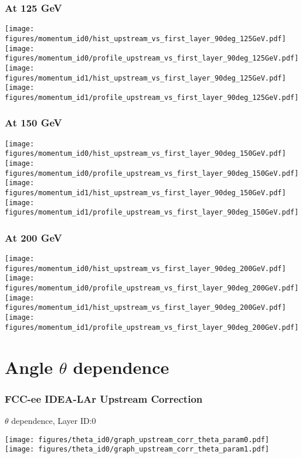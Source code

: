 \documentclass{beamer}
\newcommand{\redtext}[1]{%
  \textcolor{myRed}{#1}
}
\begin{document}
\begin{frame}
  \frametitle{At 125 GeV}

  \centering
  \texttt{[image: figures/momentum\_id0/hist\_upstream\_vs\_first\_layer\_90deg\_125GeV.pdf]}
  \texttt{[image: figures/momentum\_id0/profile\_upstream\_vs\_first\_layer\_90deg\_125GeV.pdf]} \\
  \texttt{[image: figures/momentum\_id1/hist\_upstream\_vs\_first\_layer\_90deg\_125GeV.pdf]}
  \texttt{[image: figures/momentum\_id1/profile\_upstream\_vs\_first\_layer\_90deg\_125GeV.pdf]}
\end{frame}

\begin{frame}
  \frametitle{At 150 GeV}

  \centering
  \texttt{[image: figures/momentum\_id0/hist\_upstream\_vs\_first\_layer\_90deg\_150GeV.pdf]}
  \texttt{[image: figures/momentum\_id0/profile\_upstream\_vs\_first\_layer\_90deg\_150GeV.pdf]} \\
  \texttt{[image: figures/momentum\_id1/hist\_upstream\_vs\_first\_layer\_90deg\_150GeV.pdf]}
  \texttt{[image: figures/momentum\_id1/profile\_upstream\_vs\_first\_layer\_90deg\_150GeV.pdf]}
\end{frame}

\begin{frame}
  \frametitle{At 200 GeV}

  \centering
  \texttt{[image: figures/momentum\_id0/hist\_upstream\_vs\_first\_layer\_90deg\_200GeV.pdf]}
  \texttt{[image: figures/momentum\_id0/profile\_upstream\_vs\_first\_layer\_90deg\_200GeV.pdf]} \\
  \texttt{[image: figures/momentum\_id1/hist\_upstream\_vs\_first\_layer\_90deg\_200GeV.pdf]}
  \texttt{[image: figures/momentum\_id1/profile\_upstream\_vs\_first\_layer\_90deg\_200GeV.pdf]}
\end{frame}


\section{Angle $\theta$ dependence}

\begin{frame}
  \frametitle{FCC-ee IDEA-LAr Upstream Correction}

  \begin{center}
    $\theta$ dependence, Layer \redtext{ID:\@ 0}
  \end{center}

  \texttt{[image: figures/theta\_id0/graph\_upstream\_corr\_theta\_param0.pdf]}
  \texttt{[image: figures/theta\_id0/graph\_upstream\_corr\_theta\_param1.pdf]}
\end{frame}
\end{document}
